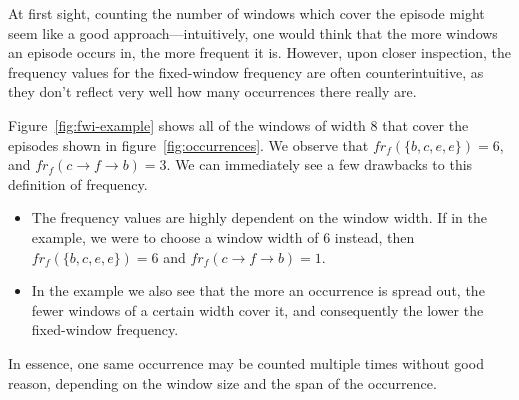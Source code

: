 At first sight, counting the number of windows which cover the episode might seem like a good approach---intuitively, one would think that the more windows an episode occurs in, the more frequent it is. However, upon closer inspection, the frequency values for the fixed-window frequency are often counterintuitive, as they don't reflect very well how many occurrences there really are.

Figure~\ref{fig:fwi-example} shows all of the windows of width 8 that cover the episodes shown in figure~\ref{fig:occurrences}. We observe that $ fr_f(\{ b, c, e, e \}) = 6 $, and $ fr_f(c \to f \to b) = 3 $. We can immediately see a few drawbacks to this definition of frequency.

\begin{itemize}
\item The frequency values are highly dependent on the window width. If in the example, we were to choose a window width of $ 6 $ instead, then $ fr_f(\{ b, c, e, e \}) = 6 $ and $ fr_f(c \to f \to b) = 1 $.
\item In the example we also see that the more an occurrence is spread out, the fewer windows of a certain width cover it, and consequently the lower the fixed-window frequency.
\end{itemize}

In essence, one same occurrence may be counted multiple times without good reason, depending on the window size and the span of the occurrence.

